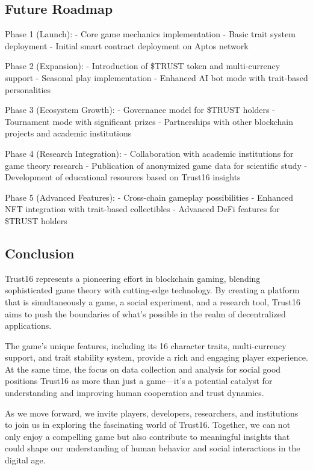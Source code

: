 \documentclass[]{article}
\begin{document}
\hypertarget{future-roadmap}{%
\subsection{Future Roadmap}\label{future-roadmap}}

Phase 1 (Launch): - Core game mechanics implementation - Basic trait
system deployment - Initial smart contract deployment on Aptos network

Phase 2 (Expansion): - Introduction of \$TRUST token and multi-currency
support - Seasonal play implementation - Enhanced AI bot mode with
trait-based personalities

Phase 3 (Ecosystem Growth): - Governance model for \$TRUST holders -
Tournament mode with significant prizes - Partnerships with other
blockchain projects and academic institutions

Phase 4 (Research Integration): - Collaboration with academic
institutions for game theory research - Publication of anonymized game
data for scientific study - Development of educational resources based
on Trust16 insights

Phase 5 (Advanced Features): - Cross-chain gameplay possibilities -
Enhanced NFT integration with trait-based collectibles - Advanced DeFi
features for \$TRUST holders

\hypertarget{conclusion}{%
\subsection{Conclusion}\label{conclusion}}

Trust16 represents a pioneering effort in blockchain gaming, blending
sophisticated game theory with cutting-edge technology. By creating a
platform that is simultaneously a game, a social experiment, and a
research tool, Trust16 aims to push the boundaries of what's possible in
the realm of decentralized applications.

The game's unique features, including its 16 character traits,
multi-currency support, and trait stability system, provide a rich and
engaging player experience. At the same time, the focus on data
collection and analysis for social good positions Trust16 as more than
just a game---it's a potential catalyst for understanding and improving
human cooperation and trust dynamics.

As we move forward, we invite players, developers, researchers, and
institutions to join us in exploring the fascinating world of Trust16.
Together, we can not only enjoy a compelling game but also contribute to
meaningful insights that could shape our understanding of human behavior
and social interactions in the digital age.
\end{document}
